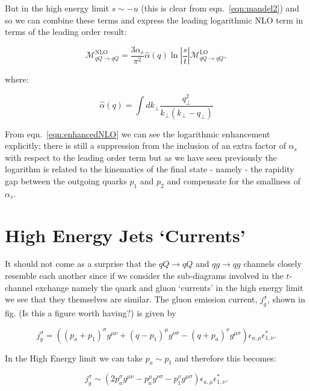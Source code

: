 		But in the high energy limit $s\sim -u$ (this is clear from eqn.~\eqref{eqn:mandel2}) and so we
		can combine these terms and express the leading logarithmic NLO term in terms of the leading order
		result:

		\begin{equation}
			\mathcal{M}_{qQ\rightarrow qQ}^{\text{NLO}} = \frac{3\alpha_s}{\pi^2}
			\hat{\alpha}(q)\ln\left|\frac{s}{t}\right|
			\mathcal{M}_{qQ\rightarrow qQ}^{\text{LO}},
			\label{eqn:enhancedNLO}
		\end{equation}

		where:

		\begin{equation}
			\hat{\alpha}(q) = \int dk_{\perp}\frac{q_{\perp}^2}{k_{\perp}(k_{\perp} - q_{\perp})}
		\end{equation}

		From eqn.~\eqref{eqn:enhancedNLO} we can see the logarithmic enhancement explicitly; there is still
		a suppression from the inclusion of an extra factor of $\alpha_s$ with respect to the leading
		order term but as we have seen previously the logarithm is related to the kinematics of the final
		state - namely - the rapidity gap between the outgoing quarks $p_1$ and $p_2$ and compensate
		for the smallness of $\alpha_s$.

	\section{High Energy Jets `Currents'}
		\label{sub:currents}

		It should not come as a surprise that the $qQ\rightarrow qQ$ and $qg\rightarrow qg$ channels closely resemble
		each another since if we consider the sub-diagrams involved in the $t$-channel exchange namely the quark and
		gluon `currents' in the high energy limit we see that they themselves are similar.  The gluon emission
		current, $j_{g}^\sigma$, shown in fig. (Is this a figure worth having?) is given by

		\begin{equation}
			j_{g}^\sigma = \left((p_a+p_1)^\sigma g^{\mu\nu} + (q - p_1)^\mu g^{\nu\sigma} -
			(q + p_a)^\nu g^{\mu\sigma}\right)\epsilon_{a, \mu}\epsilon_{1, \nu}^*.
		\end{equation}

		In the High Energy limit we can take $p_a\sim p_1$ and therefore this becomes:

		\begin{equation}
			j_{g}^\sigma \sim \left(2p_a^\sigma g^{\mu\nu} - p_a^\mu g^{\nu\sigma} -
			p_1^\nu g^{\mu\sigma}\right)\epsilon_{a, \mu}\epsilon_{1, \nu}^*.
		\end{equation}

